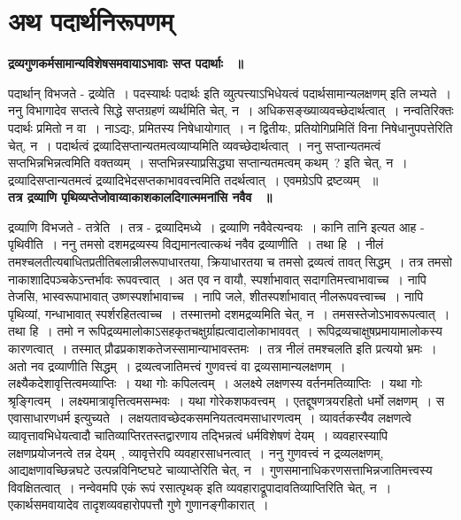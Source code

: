 \section*{अथ पदार्थनिरूपणम्}
	{\bfseries द्रव्यगुणकर्मसामान्यविशेषसमवायाऽभावाः सप्त पदार्थाः ~॥}\par
		पदार्थान् विभजते - द्रव्येति~। पदस्यार्थः पदार्थः इति व्युत्पत्त्याऽभिधेयत्वं पदार्थसामान्यलक्षणम् इति लभ्यते~। ननु विभागादेव सप्तत्वे सिद्धे सप्तग्रहणं व्यर्थमिति चेत्, न~। अधिकसङ्ख्याव्यवच्छेदार्थत्वात्~। नन्वतिरिक्तः पदार्थः प्रमितो न वा~। नाऽद्यः, प्रमितस्य निषेधायोगात्~। न द्वितीयः, प्रतियोगिप्रमितिं विना निषेधानुपपत्तेरिति चेत्, न~। पदार्थत्वं द्रव्यादिसप्तान्यतमत्वव्याप्यमिति व्यवच्छेदार्थत्वात्~। ननु सप्तान्यतमत्वं सप्तभिन्नभिन्नत्वमिति वक्तव्यम्~। सप्तभिन्नस्याप्रसिद्ध्या सप्तान्यतमत्वम् कथम्~? इति चेत्, न~। द्रव्यादिसप्तान्यतमत्वं द्रव्यादिभेदसप्तकाभाववत्त्वमिति तदर्थत्वात्~। एवमग्रेऽपि द्रष्टव्यम् ~॥\\[10pt]
	{\bfseries तत्र द्रव्याणि पृथिव्यप्तेजोवाय्वाकाशकालदिगात्ममनांसि नवैव ~॥}\par
		द्रव्याणि विभजते - तत्रेति~। तत्र - द्रव्यादिमध्ये~। द्रव्याणि नवैवेत्यन्वयः~। कानि तानि इत्यत आह - पृथिवीति~। ननु तमसो दशमद्रव्यस्य विद्यमानत्वात्कथं नवैव द्रव्याणीति~। तथा हि~। नीलं तमश्चलतीत्यबाधितप्रतीतिबलान्नीलरूपाधारतया, क्रियाधारतया च तमसो द्रव्यत्वं तावत् सिद्धम्~। तत्र तमसो नाकाशादिपञ्चकेऽन्तर्भावः रूपवत्त्वात्~। अत एव न वायौ, स्पर्शाभावात् सदागतिमत्त्वाभावाच्च~। नापि तेजसि, भास्वरूपाभावात् उष्णस्पर्शाभावाच्च~। नापि जले, शीतस्पर्शाभावात् नीलरूपवत्त्वाच्च~। नापि पृथिव्यां, गन्धाभावात् स्पर्शरहितत्वाच्च~। तस्मात्तमो दशमद्रव्यमिति चेत्, न~। तमसस्तेजोऽभावरूपत्वात्~। तथा हि~। तमो न रूपिद्रव्यमालोकाऽसहकृतचक्षुर्ग्राह्यत्वादालोकाभाववत्~। रूपिद्रव्यचाक्षुषप्रमायामालोकस्य कारणत्वात्~। तस्मात् प्रौढप्रकाशकतेजस्सामान्याभावस्तमः~। तत्र नीलं तमश्चलति इति प्रत्ययो भ्रमः~। अतो नव द्रव्याणीति सिद्धम्~। द्रव्यत्वजातिमत्त्वं गुणवत्त्वं वा द्रव्यसामान्यलक्षणम्~। लक्ष्यैकदेशावृत्तित्वमव्याप्तिः~। यथा गोः कपिलत्वम्~। अलक्ष्ये लक्षणस्य वर्तनमतिव्याप्तिः~। यथा गोः श्रृङ्गित्वम्~। लक्ष्यमात्रावृत्तित्वमसम्भवः~। यथा गोरेकशफवत्त्वम्~। एतद्दूषणत्रयरहितो धर्मो लक्षणम्~। स एवासाधारणधर्म इत्युच्यते~। लक्षयतावच्छेदकसमनियतत्वमसाधारणत्वम्~। व्यावर्तकस्यैव लक्षणत्वे व्यावृत्तावभिधेयत्वादौ चातिव्याप्तिरतस्तद्वारणाय तद्भिन्नत्वं धर्मविशेषणं देयम्~। व्यवहारस्यापि लक्षणप्रयोजनत्वे तन्न देयम्~, व्यावृत्तेरपि व्यवहारसाधनत्वात्~। ननु गुणवत्त्वं न द्रव्यलक्षणम्, आद्यक्षणावच्छिन्नघटे उत्पन्नविनिष्टघटे चाव्याप्तेरिति चेत्, न~। गुणसमानाधिकरणसत्ताभिन्नजातिमत्त्वस्य विवक्षितत्वात्~। नन्वेवमपि एकं रूपं रसात्पृथक् इति व्यवहाराद्रूपादावतिव्याप्तिरिति चेत्, न~। एकार्थसमवायादेव तादृशव्यवहारोपपत्तौ गुणे गुणानङ्गीकारात्~।\\[10pt]
